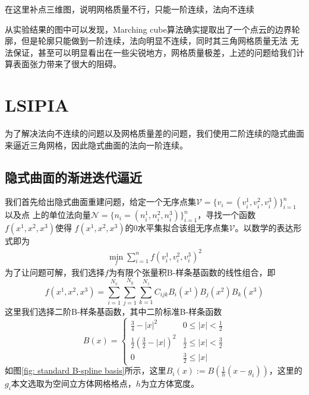 \textsf{在这里补点三维图，说明网格质量不行，只能一阶连续，法向不连续}


从实验结果的图中可以发现，Marching cube算法确实提取出了一个点云的边界轮廓，但是轮廓只能做到一阶连续，法向明显不连续，同时其三角网格质量无法
无法保证，甚至可以明显看出在一些尖锐地方，网格质量极差，上述的问题给我们计算表面张力带来了很大的阻碍。

\section{LSIPIA}
为了解决法向不连续的问题以及网格质量差的问题，我们使用二阶连续的隐式曲面来逼近三角网格，因此隐式曲面的法向一阶连续。

\subsection{隐式曲面的渐进迭代逼近}
我们首先给出隐式曲面重建问题，给定一个无序点集$\mathcal{V} = \{v_i = (v_i^1,v_i^2,v_i^3)\}_{i = 1}^n$以及点
上的单位法向量$\mathcal{N} = \{n_i = (n_i^1, n_i^2, n_i^3)\}_{i = 1}^n$，寻找一个函数$f(x^1,x^2,x^3)$使得
$f(x^1,x^2,x^3)$的$0$水平集拟合该组无序点集$\mathcal{V}$。以数学的表达形式即为
\begin{equation}
    \begin{split}
        \min_f\sum_{i = 1}^{n} f(v_i^1,v_i^2,v_i^3)^2       
    \end{split}
\end{equation}
为了让问题可解，我们选择$f$为有限个张量积B-样条基函数的线性组合，即$$f(x^1,x^2,x^3) = \sum_{i = 1}^{N_x}\sum_{j = 1}^{N_y}\sum_{k = 1}^{N_z} C_{ijk}B_i(x^1)B_j(x^2)B_k(x^3)$$
这里我们选择二阶B-样条基函数，其中二阶标准B-样条函数
$$B(x) = \begin{cases}
    \frac{3}{4} - \left | x \right | ^2  & 0 \leq \left | x \right | < \frac{1}{2}\\
    \frac{1}{2}(\frac{3}{2} - \left | x \right |)^2 & \frac{1}{2}\leq \left | x \right | <\frac{3}{2}\\
    0 & \frac{3}{2} \leq \left | x \right |
   \end{cases}$$
如图\ref{fig: standard B-spline basis}所示，这里$B_i(x) := B(\frac{1}{h}(x - g_i))$，这里的$g_i$本文选取为空间立方体网格格点，$h$为立方体宽度。

